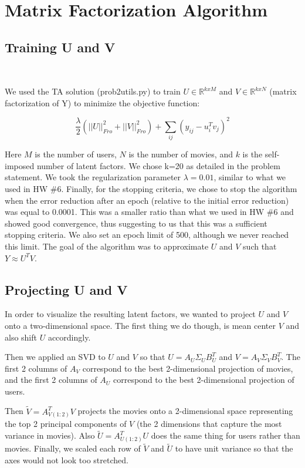 \section{Matrix Factorization Algorithm}

\medskip

\subsection{Training U and V}

~

We used the TA solution (prob2utils.py) to train $U \in \mathbb{R}^{k x M}$ and $V \in \mathbb{R}^{k x N}$  (matrix factorization of Y) to minimize the objective function:

$$\frac{\lambda}{2} ( ||U||_{Fro}^2 + ||V||_{Fro}^2) + \sum_{ij} (y_{ij} - u_i^T v_j)^2$$

Here $M$ is the number of users, $N$ is the number of movies, and $k$ is the self-imposed number of latent factors. We chose k=20 as detailed in the problem statement. We took the regularization parameter $\lambda = 0.01$, similar to what we used in HW \#6. Finally, for the stopping criteria, we chose to stop the algorithm when the error reduction after an epoch (relative to the initial error reduction) was equal to 0.0001. This was a smaller ratio than what we used in HW \#6 and showed good convergence, thus suggesting to us that this was a sufficient stopping criteria. We also set an epoch limit of 500, although we never reached this limit. The goal of the algorithm was to approximate $U$ and $V$ such that $Y \approx U^T V$. 

\subsection{Projecting U and V}

In order to visualize the resulting latent factors, we wanted to project $U$ and $V$ onto a two-dimensional space. The first thing we do though, is mean center $V$ and also shift $U$ accordingly. 

Then we applied an SVD to $U$ and $V$ so that $U = A_U \Sigma_U B_U^T$ and $V = A_V \Sigma_V B_V^T$. The first 2 columns of $A_V$ correspond to the best 2-dimensional projection of movies, and the first 2 columns of $A_U$ correspond to the best 2-dimensional projection of users.

Then $\tilde{V} = A_{V(1:2)}^T V$ projects the movies onto a 2-dimensional space representing the top 2 principal components of $V$ (the 2 dimensions that capture the most variance in movies). Also $\tilde{U} = A_{U(1:2)}^T U$ does the same thing for users rather than movies. Finally, we scaled each row of $\tilde{V}$ and $\tilde{U}$ to have unit variance so that the axes would not look too stretched.

